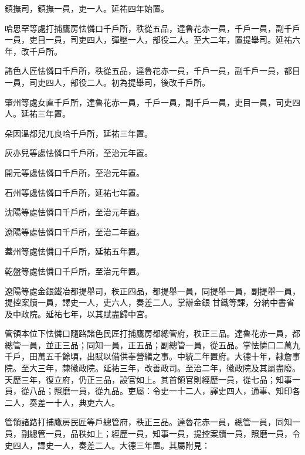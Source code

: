 \begin{pinyinscope}
 鎮撫司，鎮撫一員，吏一人。延祐四年始置。



 哈思罕等處打捕鷹房怯憐口千戶所，秩從五品，達魯花赤一員，千戶一員，副千戶一員，吏目一員，司吏四人，彈壓一人，部役二人。至大二年，置提舉司。延祐六年，改千戶所。



 諸色人匠怯憐口千戶所，秩從五品，達魯花赤一員，千戶一員，副千戶一員，都目一員，司吏四人，部役二人。初為提舉司，後改千戶所。



 肇州等處女直千戶所，達魯花赤一員，千戶一員，副千戶一員，吏目一員，司吏四人。延祐三年置。



 朵因溫都兒兀良哈千戶所，延祐三年置。



 灰亦兒等處怯憐口千戶所，至治元年置。



 開元等處怯憐口千戶所，至治元年置。



 石州等處怯憐口千戶所，延祐七年置。



 沈陽等處怯憐口千戶所，至治元年置。



 遼陽等處怯憐口千戶所，至治二年置。



 蓋州等處怯憐口千戶所，延祐五年置。



 乾盤等處怯憐口千戶所，至治元年置。



 遼陽等處金銀鐵冶都提舉司，秩正四品，都提舉一員，同提舉一員，副提舉一員，提控案牘一員，譯史一人，吏六人，奏差二人。掌辦金銀甘鐵等課，分納中書省及中政院。延祐七年，以其賦盡歸中宮。



 管領本位下怯憐口隨路諸色民匠打捕鷹房都總管府，秩正三品。達魯花赤一員，都總管一員，並正三品；同知一員，正五品；副總管一員，從五品。掌怯憐口二萬九千戶，田萬五千餘頃，出賦以備供奉營繕之事。中統二年置府。大德十年，隸詹事院。至大三年，隸徽政院。延祐三年，改善政司。至治二年，徽政院及其屬盡廢。天歷三年，復立府，仍正三品，設官如上。其首領官則經歷一員，從七品；知事一員，從八品；照磨一員，從九品。吏屬：令史一十二人，譯史四人，通事、知印各二人，奏差一十人，典吏六人。



 管領諸路打捕鷹房民匠等戶總管府，秩正三品。達魯花赤一員，總管一員，同知一員，副總管一員，品秩如上；經歷一員，知事一員，提控案牘一員，照磨一員，令史四人，譯史一人，奏差二人。大德三年置。其屬附見：




\end{pinyinscope}
